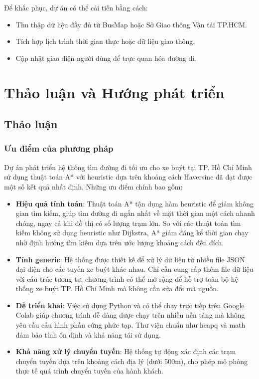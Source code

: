 \documentclass[a4paper,12pt]{article}
\begin{document}
Để khắc phục, dự án có thể cải tiến bằng cách:
\begin{itemize}
    \item Thu thập dữ liệu đầy đủ từ BusMap \cite{busmap} hoặc Sở Giao thông Vận tải TP.HCM.
    \item Tích hợp lịch trình thời gian thực hoặc dữ liệu giao thông.
    \item Cập nhật giao diện người dùng để trực quan hóa đường đi.
\end{itemize}

\newpage
\section{Thảo luận và Hướng phát triển}
\subsection{Thảo luận}
\subsubsection{Ưu điểm của phương pháp}

Dự án phát triển hệ thống tìm đường đi tối ưu cho xe buýt tại TP. Hồ Chí Minh sử dụng thuật toán A* với heuristic dựa trên khoảng cách Haversine đã đạt được một số kết quả nhất định. Những ưu điểm chính bao gồm:

\begin{itemize}
    \item \textbf{Hiệu quả tính toán}: Thuật toán A* tận dụng hàm heuristic để giảm không gian tìm kiếm, giúp tìm đường đi ngắn nhất về mặt thời gian một cách nhanh chóng, ngay cả khi đồ thị có số lượng trạm lớn. So với các thuật toán tìm kiếm không sử dụng heuristic như Dijkstra, A* giảm đáng kể thời gian chạy nhờ định hướng tìm kiếm dựa trên ước lượng khoảng cách đến đích.
    
    \item \textbf{Tính generic}: Hệ thống được thiết kế để xử lý dữ liệu từ nhiều file JSON đại diện cho các tuyến xe buýt khác nhau. Chỉ cần cung cấp thêm file dữ liệu với cấu trúc tương tự, chương trình có thể mở rộng để hỗ trợ toàn bộ hệ thống xe buýt TP. Hồ Chí Minh mà không cần sửa đổi mã nguồn.
    
    \item \textbf{Dễ triển khai}: Việc sử dụng Python và có thể chạy trực tiếp trên Google Colab giúp chương trình dễ dàng được chạy trên nhiều nền tảng mà không yêu cầu cấu hình phần cứng phức tạp. Thư viện chuẩn như heapq và math đảm bảo tính ổn định và khả năng tái sử dụng.
    
    \item \textbf{Khả năng xử lý chuyển tuyến}: Hệ thống tự động xác định các trạm chuyển tuyến dựa trên khoảng cách địa lý (dưới 500m), cho phép mô phỏng thực tế quá trình chuyển tuyến của hành khách.
\end{itemize}
\end{document}
